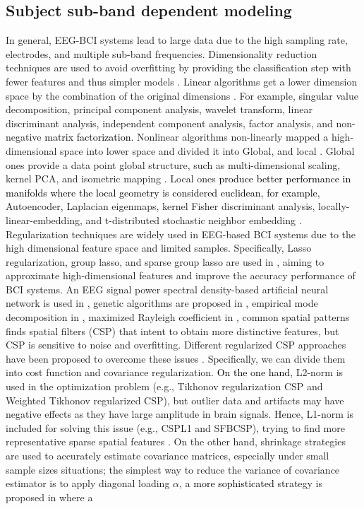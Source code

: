 \subsection{Subject sub-band dependent modeling}

In general, EEG-BCI systems lead to large data due to the high sampling rate, electrodes, and multiple sub-band frequencies. Dimensionality reduction techniques are used to avoid overfitting by providing the classification step with fewer features and thus simpler models \cite{van2009dimensionality}. Linear algorithms get a lower dimension space by the combination of the original dimensions \cite{gupta2015performance}. For example, singular value decomposition, principal component analysis, wavelet transform, linear discriminant analysis, independent component analysis, factor analysis, and non-negative \textcolor{black}{matrix factorization.} Nonlinear algorithms non-linearly mapped a high-dimensional space into lower space and divided it into Global, and local \cite{singh2021comprehensive}. Global ones provide a data point global structure, such as multi-dimensional scaling, kernel PCA, and isometric mapping \cite{iturralde2012motor,gramfort2007low}. Local ones \textcolor{black}{produce better performance in manifolds where the local geometry is considered euclidean, for example}, Autoencoder, Laplacian eigenmaps, kernel Fisher discriminant analysis, locally-linear-embedding, and t-distributed stochastic neighbor embedding \cite{lee2004feature,li2016applying}. Regularization techniques are widely used in EEG-based BCI systems due to the high dimensional feature space and limited samples. Specifically, Lasso regularization, group lasso, and sparse group lasso are used in \cite{tibshirani1996regression,simon2013sparse,yeh2012novel}, aiming to approximate high-dimensional features and improve the accuracy performance of BCI systems. An EEG signal power spectral density-based artificial neural network is used in \cite{coelho2012automatic}, genetic algorithms are proposed in \cite{rejer2013genetic}, empirical mode decomposition in \cite{noshadi2014selection}, maximized Rayleigh coefficient in \cite{he2013channel}, common spatial patterns finds spatial filters (CSP) that intent to obtain more distinctive features, but CSP is sensitive to noise and overfitting. Different regularized CSP approaches have been proposed to overcome these issues \cite{arvaneh2011optimizing}. Specifically, we can divide them into cost function and covariance regularization. \textcolor{black}{On the one hand}, L2-norm is used in the optimization problem (e.g., Tikhonov regularization CSP and Weighted Tikhonov regularized CSP), but outlier data and artifacts may have negative effects as they have large amplitude in brain signals. Hence, L1-norm is included for solving this issue (e.g., CSPL1 and SFBCSP), trying to find more representative sparse spatial features \cite{anowar2021conceptual}. On the other hand, shrinkage strategies are used to accurately estimate covariance matrices, especially under small sample sizes situations; the simplest way to reduce the variance of covariance estimator is to apply diagonal loading $\alpha$, \textcolor{black}{a more sophisticated}  strategy is proposed in \cite{ledoit2004well} where a 